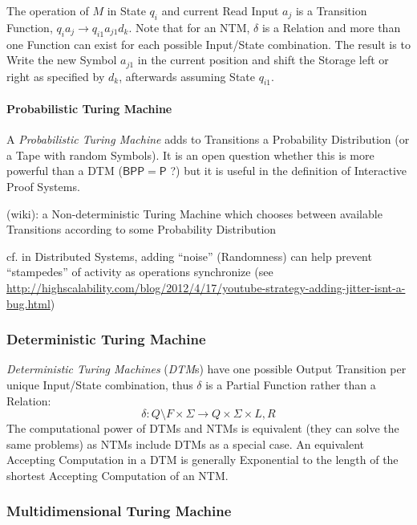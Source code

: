 The operation of $M$ in State $q_i$ and current Read Input $a_j$ is a
Transition Function, $q_i a_j \rightarrow q_{i1} a_{j1} d_k$. Note
that for an NTM, $\delta$ is a Relation and more than one Function can
exist for each possible Input/State combination. The result is to
Write the new Symbol $a_{j1}$ in the current position and shift the
Storage left or right as specified by $d_k$, afterwards assuming State
$q_{i1}$.



\paragraph{Probabilistic Turing Machine}
\label{sec:probabilistic_turing_machine}\hfill

A \emph{Probabilistic Turing Machine} adds to Transitions a Probability
Distribution (or a Tape with random Symbols). It is an open question whether
this is more powerful than a DTM ($\mathsf{BPP}=\mathsf{P}$ ?) but it is useful
in the definition of Interactive Proof Systems. %

(wiki): a Non-deterministic Turing Machine which chooses between available
Transitions according to some Probability Distribution

cf. in Distributed Systems, adding ``noise'' (Randomness) can help prevent
``stampedes'' of activity as operations synchronize (see
\url{http://highscalability.com/blog/2012/4/17/youtube-strategy-adding-jitter-isnt-a-bug.html})



\subsubsection{Deterministic Turing Machine}
\label{sec:deterministic_turing_machine}

\emph{Deterministic Turing Machines} (\emph{DTM}s) have one possible
Output Transition per unique Input/State combination, thus $\delta$ is
a Partial Function rather than a Relation:
\[
  \delta : Q \setminus F \times \Sigma \rightarrow Q \times
  \Sigma \times {L,R}
\]
The computational power of DTMs and NTMs is equivalent (they can solve
the same problems) as NTMs include DTMs as a special case. An
equivalent Accepting Computation in a DTM is generally Exponential to
the length of the shortest Accepting Computation of an NTM.



\subsubsection{Multidimensional Turing Machine}
\label{sec:multidimensional_turing_machine}

